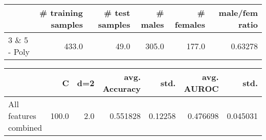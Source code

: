 \begin{tabular}{lrrrrr}
\hline
{} &  \# training samples &  \# test samples &  \# males &  \# females &  male/fem ratio \\
\hline
3 \& 5 - Poly &               433.0 &            49.0 &    305.0 &      177.0 &         0.63278 \\
\hline
\end{tabular}
\begin{tabular}{lrrrrrr}
\hline
{} &      C &  d=2 &  avg. Accuracy &     std. &  avg. AUROC &      std. \\
\hline
All features combined &  100.0 &  2.0 &       0.551828 &  0.12258 &    0.476698 &  0.045031 \\
\hline
\end{tabular}
